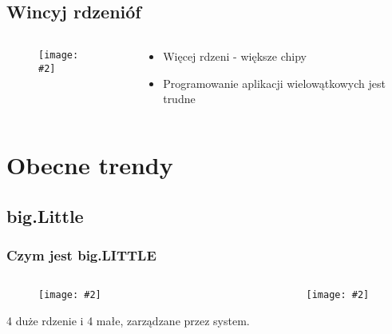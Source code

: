 \documentclass[aspectratio=169]{beamer}
\newcommand{\obrazek}[2]{
\begin{figure}[h]
    \centering
    \texttt{[image: \#2]}
\end{figure}
}
\begin{document}
\subsection{Wincyj rdzenióf}
\begin{frame}
    \begin{columns}
        \begin{column}{.5\textwidth}
            \obrazek{.3}{cores.jpg}
        \end{column}
        \begin{column}{.5\textwidth}
            \begin{itemize}
                \item Więcej rdzeni - większe chipy
                \item Programowanie aplikacji wielowątkowych jest trudne
            \end{itemize}
        \end{column}
    \end{columns}
\end{frame}

\section{Obecne trendy}
\subsection{big.Little}
\begin{frame}
    \frametitle{Czym jest big.LITTLE}
    \begin{columns}
        \begin{column}{.3\textwidth}
            \obrazek{.23}{bigLittle.jpg}
            \begin{center}
                \tiny{4 duże rdzenie i 4 małe, zarządzane przez system.}
            \end{center}
        \end{column}
        \begin{column}{.7\textwidth}
            \obrazek{.12}{m1.jpg}
        \end{column}
    \end{columns}
\end{frame}
\end{document}

